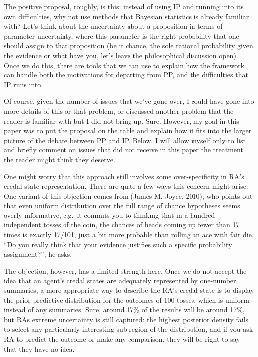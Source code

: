 \documentclass[
  10pt,
  dvipsnames,enabledeprecatedfontcommands]{scrartcl}
\begin{document}
The positive proposal, roughly, is this: instead of using IP and running
into its own difficulties, why not use methods that Bayesian statistics
is already familiar with? Let's think about the uncertainty about a
proposition in terms of parameter uncertainty, where this parameter is
the right probability that one should assign to that proposition (be it
chance, the sole rational probability given the evidence or what have
you, let's leave the philosophical discussion open). Once we do this,
there are tools that we can use to explain how the framework can handle
both the motivations for departing from PP, and the difficulties that IP
runs into.

Of course, given the number of issues that we've gone over, I could have
gone into more details of this or that problem, or discussed another
problem that the reader is familiar with but I did not bring up. Sure.
However, my goal in this paper was to put the proposal on the table and
explain how it fits into the larger picture of the debate between PP and
IP. Below, I will allow myself only to list and briefly comment on
issues that did not receive in this paper the treatment the reader might
think they deserve.

One might worry that this approach still involves some over-specificity
in RA's credal state representation. There are quite a few ways this
concern might arise. One variant of this objection comes from (James M.
Joyce, 2010), who points out that even uniform distribution over the
full range of chance hypotheses seems overly informative, e.g.~it
commits you to thinking that in a hundred independent tosses of the
coin, the chances of heads coming up fewer than 17 times is exactly
17/101, just a bit more probable than rolling an ace with fair die. ``Do
you really think that your evidence justifies such a specific
probability assignment?'', he asks.

The objection, however, has a limited strength here. Once we do not
accept the idea that an agent's credal states are adequately represented
by one-number summaries, a more appropriate way to describe the RA's
credal state is to display the prior predictive distribution for the
outcomes of 100 tosses, which is uniform instead of any summaries. Sure,
around 17\% of the results will be around 17\%, but RAs extreme
uncertainty is still captured: the highest posterior density fails to
select any particularly interesting sub-region of the distribution, and
if you ask RA to predict the outcome or make any comparison, they will
be right to say that they have no idea.
\end{document}
